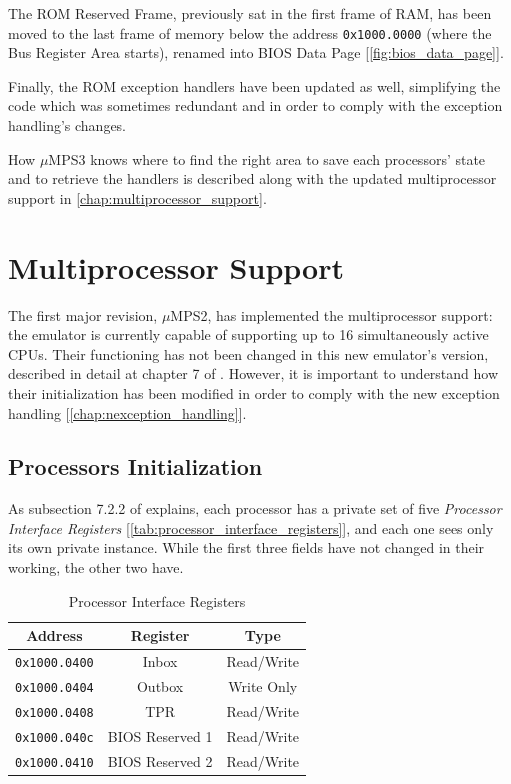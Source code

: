 \documentclass[12pt,a4paper,openright,twoside]{report}
\begin{document}
The ROM Reserved Frame, previously sat in the first frame of RAM, has been moved to the last frame of memory below the address \texttt{0x1000.0000} (where the Bus Register Area starts), renamed into BIOS Data Page [\autoref{fig:bios_data_page}].

Finally, the ROM exception handlers have been updated as well, simplifying the code which was sometimes redundant and in order to comply with the exception handling's changes.

How $\mu$MPS3 knows where to find the right area to save each processors' state and to retrieve the handlers is described along with the updated multiprocessor support in \autoref{chap:multiprocessor_support}.

\chapter{Multiprocessor Support}
\label{chap:multiprocessor_support}
\lhead[\fancyplain{}{\bfseries\thepage}]{\fancyplain{}{\bfseries\rightmark}}
The first major revision, $\mu$MPS2, has implemented the multiprocessor support: the emulator is currently capable of supporting up to 16 simultaneously active CPUs.
Their functioning has not been changed in this new emulator's version, described in detail at chapter 7 of \cite{old_pops}.
However, it is important to understand how their initialization has been modified in order to comply with the new exception handling [\autoref{chap:nexception_handling}].

\section{Processors Initialization}
As subsection 7.2.2 of \cite{old_pops} explains, each processor has a private set of five \textit{Processor Interface Registers} [\autoref{tab:processor_interface_registers}], and each one sees only its own private instance.
While the first three fields have not changed in their working, the other two have.

\begin{table}[h]
	\centering
	\renewcommand{\arraystretch}{0.85}
	\begin{tabular}{|c|c|c|}
		\hline
		Address              & Register        & Type       \\ \hline\hline
		\texttt{0x1000.0400} & Inbox           & Read/Write \\ \hline
		\texttt{0x1000.0404} & Outbox          & Write Only \\ \hline
		\texttt{0x1000.0408} & TPR             & Read/Write \\ \hline
		\texttt{0x1000.040c} & BIOS Reserved 1 & Read/Write \\ \hline
		\texttt{0x1000.0410} & BIOS Reserved 2 & Read/Write \\ \hline
	\end{tabular}
	\caption{Processor Interface Registers}
	\label{tab:processor_interface_registers}
\end{table}
\end{document}
